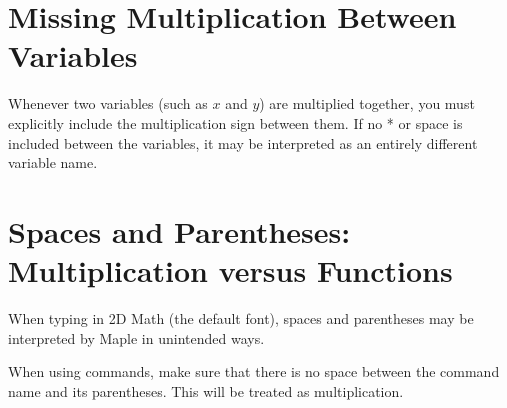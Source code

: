 \section*{Missing Multiplication Between Variables}

Whenever two variables (such as $x$ and $y$) are multiplied together, you must explicitly include the multiplication sign between them. If no * or space is included between the variables, it may be interpreted as an entirely different variable name.

\begin{maplegroup}
\begin{mapleinput}
\end{mapleinput}
\vspace{.3cm}
\mapleresult
\begin{maplelatex}
\end{maplelatex}
\end{maplegroup}

\section*{Spaces and Parentheses: Multiplication versus Functions}

When typing in 2D Math (the default font), spaces and parentheses may be interpreted by Maple in unintended ways. 

When using commands, make sure that there is no space between the command name and its parentheses. This will be treated as multiplication.

\begin{maplegroup}
\begin{mapleinput}
\end{mapleinput}
\mapleresult
\begin{maplelatex}
\end{maplelatex}
\end{maplegroup}

